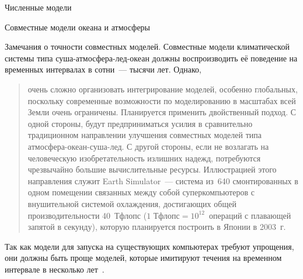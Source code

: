 \begin{chapter}{Численные модели}
\begin{section}{Совместные модели океана и атмосферы}
\begin{paragraph}{Замечания о точности совместных моделей.}%
%
%
Совместные модели климатической системы типа суша-атмосфера-лед-океан 
должны воспроизводить её поведение на временных интервалах
в сотни~--- тысячи лет. Однако,
%
\begin{quote}
очень сложно организовать интегрирование моделей, особенно глобальных,
поскольку современные возможности по моделированию в масштабах всей Земли
очень ограничены. Планируется применить двойственный подход. 
С одной стороны, будут предприниматься усилия в сравнительно традиционном 
направлении улучшения совместных моделей типа атмосфера-океан-суша-лед.
С другой стороны, если не возлагать на человеческую изобретательность излишних
надежд, потребуются чрезвычайно большие вычислительные ресурсы. Иллюстрацией
этого направления служит Earth Simulator~--- система из~640 
смонтированных в одном помещении связанных между собой суперкомпьютеров 
с внушительной системой охлаждения,
достигающих общей производительности 40~Тфлопс 
($1\text{~Тфлопс} = 10^{12}$~операций с плавающей запятой в секунду), 
которую планируется построить в Японии в 2003~г.~\cite{Newton:1999}
%
\end{quote}
Так как модели для запуска на существующих компьютерах требуют упрощения,
они должны быть проще моделей, которые имитируют течения на временном 
интервале в несколько лет~\cite{WCRP:1995}.
%


\end{paragraph}
\end{section}
\end{chapter}
